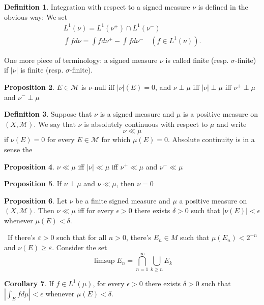 \documentclass[12pt,a4paper]{book}
\newenvironment{prooff}{{\noindent\it\textcolor{cyan!40!black}{Proof}:}\,}{\par}
\theoremstyle{definition}
\newtheorem{defn}{Definition}[section]
\newtheorem{coro}[defn]{Corollary}
\newtheorem{prop}[defn]{Proposition}
\begin{document}
\begin{defn}
    Integration with respect to a signed measure $\nu$ is defined in the obvious way: We set
    $$
        \begin{gathered}
            L^1(\nu)=L^1\left(\nu^{+}\right) \cap L^1\left(\nu^{-}\right) \\
            \int f d \nu=\int f d \nu^{+}-\int f d \nu^{-} \quad\left(f \in L^1(\nu)\right) .
        \end{gathered}
    $$

    One more piece of terminology: a signed measure $\nu$ is called finite (resp. $\sigma$-finite) if $|\nu|$ is finite (resp. $\sigma$-finite).
\end{defn}
\begin{prop}
    $E \in \mathcal{M}$ is $\nu$-null iff $|\nu|(E)=0$, and $\nu \perp \mu$ iff $|\nu| \perp \mu$ iff $\nu^{+} \perp \mu$ and $\nu^{-} \perp \mu$
\end{prop}
\begin{defn}
    Suppose that $\nu$ is a signed measure and $\mu$ is a positive measure on $(X, \mathcal{M})$. We say that $\nu$ is absolutely continuous with respect to $\mu$ and write
    $$
        \nu \ll \mu
    $$
    if $\nu(E)=0$ for every $E \in \mathcal{M}$ for which $\mu(E)=0$. Absolute continuity is in a sense the
\end{defn}
\begin{prop}
    $\nu \ll \mu$ iff $|\nu| \ll \mu$ iff $\nu^{+} \ll \mu$ and $\nu^{-} \ll \mu$
\end{prop}
\begin{prop}
    If $\nu \perp \mu$ and $\nu \ll \mu$, then $\nu=0$
\end{prop}
\begin{prop}
    Let $\nu$ be a finite signed measure and $\mu$ a positive measure on $(X, \mathcal{M})$. Then $\nu \ll \mu$ iff for every $\epsilon>0$ there exists $\delta>0$ such that $|\nu(E)|<\epsilon$ whenever $\mu(E)<\delta$.
\end{prop}
\begin{prooff}
    If there's $\varepsilon>0$ such that for all $n>0$, there's $E_n\in M$ such that $\mu(E_n)<2^{-n}$ and $\nu(E)\ge \varepsilon$.
    Consider the set
    \begin{equation*}
        \limsup  E_n=\bigcap_{n=1}^\infty \bigcup_{k\ge n} E_k
    \end{equation*}
\end{prooff}
\begin{coro}
    If $f \in L^1(\mu)$, for every $\epsilon>0$ there exists $\delta>0$ such that $\left|\int_E f d \mu\right|<\epsilon$ whenever $\mu(E)<\delta$.
\end{coro}
\end{document}
